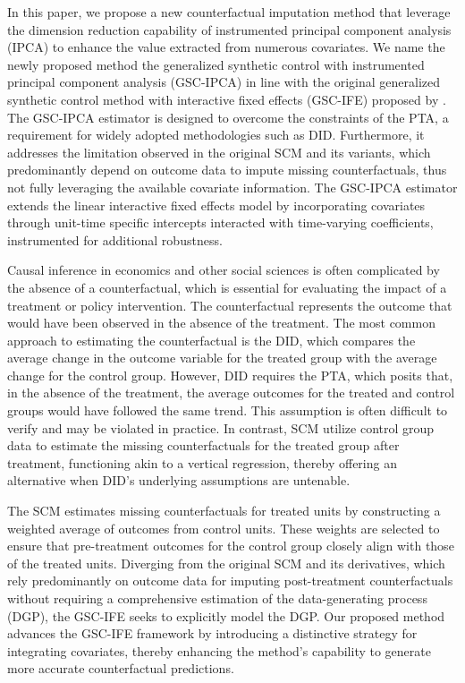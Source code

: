 \documentclass[12pt]{article}
\begin{document}
In this paper, we propose a new counterfactual imputation method that leverage the dimension reduction capability of instrumented principal component analysis (IPCA) to enhance the value extracted from numerous covariates. We name the newly proposed method the generalized synthetic control with instrumented principal component analysis (GSC-IPCA) in line with the original generalized synthetic control method with interactive fixed effects (GSC-IFE) proposed by \cite{xu2017generalized}. The GSC-IPCA estimator is designed to overcome the constraints of the PTA, a requirement for widely adopted methodologies such as DID. Furthermore, it addresses the limitation observed in the original SCM and its variants, which predominantly depend on outcome data to impute missing counterfactuals, thus not fully leveraging the available covariate information. The GSC-IPCA estimator extends the linear interactive fixed effects model by incorporating covariates through unit-time specific intercepts interacted with time-varying coefficients, instrumented for additional robustness.

Causal inference in economics and other social sciences is often complicated by the absence of a counterfactual, which is essential for evaluating the impact of a treatment or policy intervention. The counterfactual represents the outcome that would have been observed in the absence of the treatment. The most common approach to estimating the counterfactual is the DID, which compares the average change in the outcome variable for the treated group with the average change for the control group. However, DID requires the PTA, which posits that, in the absence of the treatment, the average outcomes for the treated and control groups would have followed the same trend. This assumption is often difficult to verify and may be violated in practice. In contrast, SCM utilize control group data to estimate the missing counterfactuals for the treated group after treatment, functioning akin to a vertical regression, thereby offering an alternative when DID's underlying assumptions are untenable. 

The SCM estimates missing counterfactuals for treated units by constructing a weighted average of outcomes from control units. These weights are selected to ensure that pre-treatment outcomes for the control group closely align with those of the treated units. Diverging from the original SCM and its derivatives, which rely predominantly on outcome data for imputing post-treatment counterfactuals without requiring a comprehensive estimation of the data-generating process (DGP), the GSC-IFE seeks to explicitly model the DGP. Our proposed method advances the GSC-IFE framework by introducing a distinctive strategy for integrating covariates, thereby enhancing the method's capability to generate more accurate counterfactual predictions.
\end{document}
